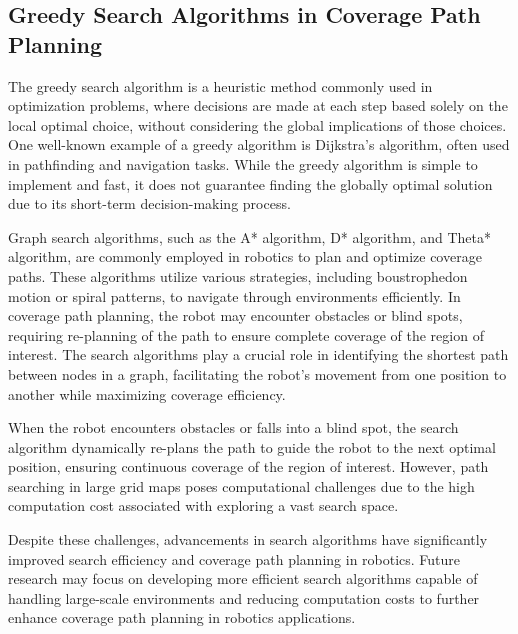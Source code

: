 \subsection{Greedy Search Algorithms in Coverage Path Planning}

The greedy search algorithm is a heuristic method commonly used in optimization problems, where decisions are made at each step based solely on the local optimal choice, without considering the global implications of those choices. One well-known example of a greedy algorithm is Dijkstra's algorithm, often used in pathfinding and navigation tasks. While the greedy algorithm is simple to implement and fast, it does not guarantee finding the globally optimal solution due to its short-term decision-making process.

\vspace*{6mm}

Graph search algorithms, such as the A* algorithm, D* algorithm, and Theta* algorithm, are commonly employed in robotics to plan and optimize coverage paths. These algorithms utilize various strategies, including boustrophedon motion or spiral patterns, to navigate through environments efficiently. In coverage path planning, the robot may encounter obstacles or blind spots, requiring re-planning of the path to ensure complete coverage of the region of interest. The search algorithms play a crucial role in identifying the shortest path between nodes in a graph, facilitating the robot's movement from one position to another while maximizing coverage efficiency.

\vspace*{6mm}

When the robot encounters obstacles or falls into a blind spot, the search algorithm dynamically re-plans the path to guide the robot to the next optimal position, ensuring continuous coverage of the region of interest. However, path searching in large grid maps poses computational challenges due to the high computation cost associated with exploring a vast search space.

\vspace*{6mm}

Despite these challenges, advancements in search algorithms have significantly improved search efficiency and coverage path planning in robotics. Future research may focus on developing more efficient search algorithms capable of handling large-scale environments and reducing computation costs to further enhance coverage path planning in robotics applications.


